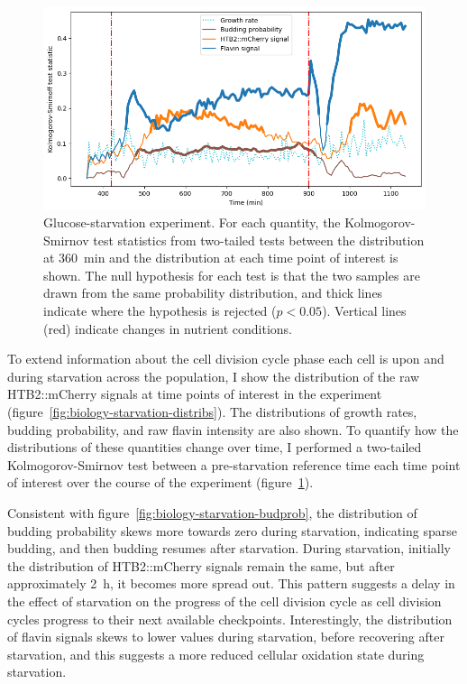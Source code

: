 \begin{figure}
  \centering
  \includegraphics[width=\textwidth]{19972_ks_highlight}
  \caption{
    Glucose-starvation experiment.
    For each quantity, the Kolmogorov-Smirnov test statistics from two-tailed tests between the distribution at \SI{360}{\minute} and the distribution at each time point of interest is shown.
    The null hypothesis for each test is that the two samples are drawn from the same probability distribution, and thick lines indicate where the hypothesis is rejected ($p < 0.05$).
    Vertical lines (red) indicate changes in nutrient conditions.
  }
  \label{fig:biology-starvation-ks}
\end{figure}


To extend information about the cell division cycle phase each cell is upon and during starvation across the population, I show the distribution of the raw HTB2::mCherry signals at time points of interest in the experiment (figure~\ref{fig:biology-starvation-distribs}).
The distributions of growth rates, budding probability, and raw flavin intensity are also shown.
To quantify how the distributions of these quantities change over time, I performed a two-tailed Kolmogorov-Smirnov test between a pre-starvation reference time each time point of interest over the course of the experiment (figure~\ref{fig:biology-starvation-ks}).

Consistent with figure~\ref{fig:biology-starvation-budprob}, the distribution of budding probability skews more towards zero during starvation, indicating sparse budding, and then budding resumes after starvation.
During starvation, initially the distribution of HTB2::mCherry signals remain the same, but after approximately \SI{2}{\hour}, it becomes more spread out.
This pattern suggests a delay in the effect of starvation on the progress of the cell division cycle as cell division cycles progress to their next available checkpoints.
Interestingly, the distribution of flavin signals skews to lower values during starvation, before recovering after starvation, and this suggests a more reduced cellular oxidation state during starvation.



